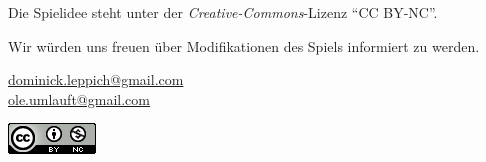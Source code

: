 Die Spielidee steht unter der \emph{Creative-Commons}-Lizenz ``CC BY-NC''.

Wir würden uns freuen über Modifikationen des Spiels informiert zu werden.

\href{mailto:dominick.leppich@gmail.com}{dominick.leppich@gmail.com} \\
\href{mailto:ole.umlauft@gmail.com}{ole.umlauft@gmail.com}
\begin{flushright}
\includegraphics[scale=0.7]{graphic/cc.png}
\end{flushright}
